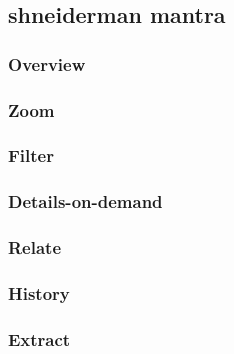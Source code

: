 \subsection{shneiderman mantra}
\subsubsection{Overview}
\subsubsection{Zoom}
\subsubsection{Filter}
\subsubsection{Details-on-demand}
\subsubsection{Relate}
\subsubsection{History}
\subsubsection{Extract}